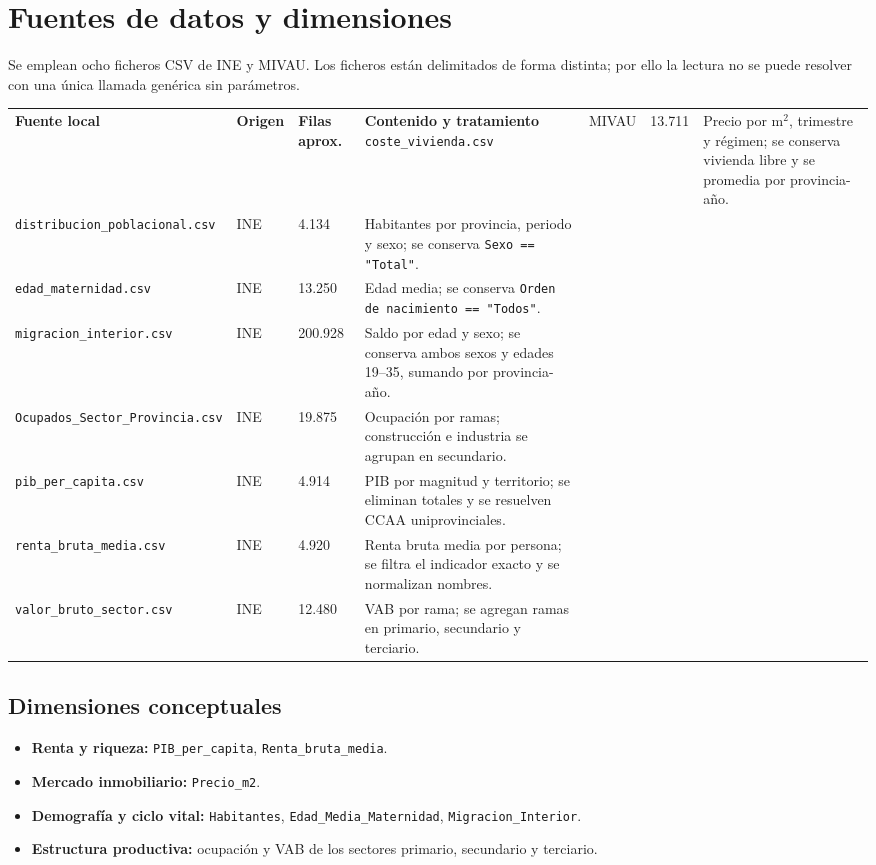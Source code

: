 \documentclass[11pt,a4paper]{article}
\newcommand{\code}[1]{\texttt{\small #1}}
\begin{document}
\section{Fuentes de datos y dimensiones}
Se emplean ocho ficheros CSV de INE y MIVAU. Los ficheros están delimitados de forma distinta; por ello la lectura no se puede resolver con una única llamada genérica sin parámetros.

\begin{longtable}{p{}p{}p{}p{}}
\toprule
\textbf{Fuente local} & \textbf{Origen} & \textbf{Filas aprox.} & \textbf{Contenido y tratamiento}\
\midrule
\endhead
\code{coste\_vivienda.csv} & MIVAU & 13.711 & Precio por m$^2$, trimestre y régimen; se conserva vivienda libre y se promedia por provincia-año.\\
\code{distribucion\_poblacional.csv} & INE & 4.134 & Habitantes por provincia, periodo y sexo; se conserva \code{Sexo == "Total"}.\\
\code{edad\_maternidad.csv} & INE & 13.250 & Edad media; se conserva \code{Orden de nacimiento == "Todos"}.\\
\code{migracion\_interior.csv} & INE & 200.928 & Saldo por edad y sexo; se conserva ambos sexos y edades 19--35, sumando por provincia-año.\\
\code{Ocupados\_Sector\_Provincia.csv} & INE & 19.875 & Ocupación por ramas; construcción e industria se agrupan en secundario.\\
\code{pib\_per\_capita.csv} & INE & 4.914 & PIB por magnitud y territorio; se eliminan totales y se resuelven CCAA uniprovinciales.\\
\code{renta\_bruta\_media.csv} & INE & 4.920 & Renta bruta media por persona; se filtra el indicador exacto y se normalizan nombres.\\
\code{valor\_bruto\_sector.csv} & INE & 12.480 & VAB por rama; se agregan ramas en primario, secundario y terciario.\\
\bottomrule
\end{longtable}

\subsection{Dimensiones conceptuales}
\begin{itemize}[leftmargin=1.5em]
\item \textbf{Renta y riqueza:} \code{PIB\_per\_capita}, \code{Renta\_bruta\_media}.
\item \textbf{Mercado inmobiliario:} \code{Precio\_m2}.
\item \textbf{Demografía y ciclo vital:} \code{Habitantes}, \code{Edad\_Media\_Maternidad}, \code{Migracion\_Interior}.
\item \textbf{Estructura productiva:} ocupación y VAB de los sectores primario, secundario y terciario.
\end{itemize}
\end{document}
